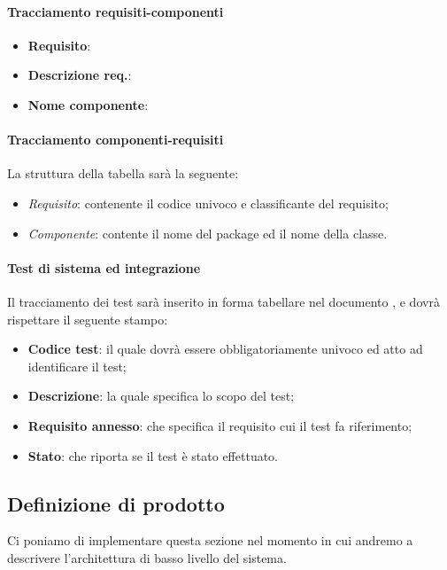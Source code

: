 \paragraph{Tracciamento requisiti-componenti}
\begin{itemize}
\item \textbf{Requisito}:
\item \textbf{Descrizione req.}:
\item \textbf{Nome componente}:
\end{itemize}

\paragraph{Tracciamento componenti-requisiti}
La struttura della tabella sarà la seguente:
\begin{itemize}
\item \textit{Requisito}: contenente il codice univoco e classificante del requisito;
\item \textit{Componente}: contente il nome del package ed il nome della classe.
\end{itemize}

\paragraph{Test di sistema ed integrazione}
Il tracciamento dei test sarà inserito in forma tabellare nel documento \PianoDiQualifica, e dovrà rispettare il seguente stampo:
\begin{itemize}
\item \textbf{Codice test}: il quale dovrà essere obbligatoriamente univoco ed atto ad identificare il test;
\item \textbf{Descrizione}: la quale specifica lo scopo del test;
\item \textbf{Requisito annesso}: che specifica il requisito cui il test fa riferimento;
\item \textbf{Stato}: che riporta se il test è stato effettuato.
\end{itemize}

\subsection{Definizione di prodotto}
Ci poniamo di implementare questa sezione nel momento in cui andremo a descrivere l'architettura di basso livello del sistema.